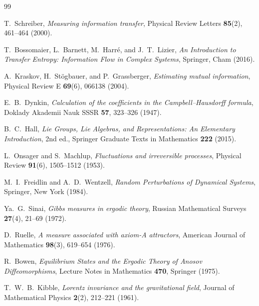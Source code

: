 \documentclass[12pt,a4paper]{article}
\theoremstyle{plain}
\theoremstyle{definition}
\theoremstyle{remark}
\begin{document}
\begin{thebibliography}{99}

T.~Schreiber,
\textit{Measuring information transfer},
Physical Review Letters \textbf{85}(2), 461--464 (2000).

T.~Bossomaier, L.~Barnett, M.~Harr\'{e}, and J.~T.~Lizier,
\textit{An Introduction to Transfer Entropy: Information Flow in Complex Systems},
Springer, Cham (2016).

A.~Kraskov, H.~St\"{o}gbauer, and P.~Grassberger,
\textit{Estimating mutual information},
Physical Review E \textbf{69}(6), 066138 (2004).

E.~B.~Dynkin,
\textit{Calculation of the coefficients in the Campbell--Hausdorff formula},
Doklady Akademii Nauk SSSR \textbf{57}, 323--326 (1947).

B.~C.~Hall,
\textit{Lie Groups, Lie Algebras, and Representations: An Elementary Introduction},
2nd ed., Springer Graduate Texts in Mathematics \textbf{222} (2015).

L.~Onsager and S.~Machlup,
\textit{Fluctuations and irreversible processes},
Physical Review \textbf{91}(6), 1505--1512 (1953).

M.~I.~Freidlin and A.~D.~Wentzell,
\textit{Random Perturbations of Dynamical Systems},
Springer, New York (1984).

Ya.~G.~Sinai,
\textit{Gibbs measures in ergodic theory},
Russian Mathematical Surveys \textbf{27}(4), 21--69 (1972).

D.~Ruelle,
\textit{A measure associated with axiom-A attractors},
American Journal of Mathematics \textbf{98}(3), 619--654 (1976).

R.~Bowen,
\textit{Equilibrium States and the Ergodic Theory of Anosov Diffeomorphisms},
Lecture Notes in Mathematics \textbf{470}, Springer (1975).

T.~W.~B.~Kibble,
\textit{Lorentz invariance and the gravitational field},
Journal of Mathematical Physics \textbf{2}(2), 212--221 (1961).


\end{thebibliography}
\end{document}
